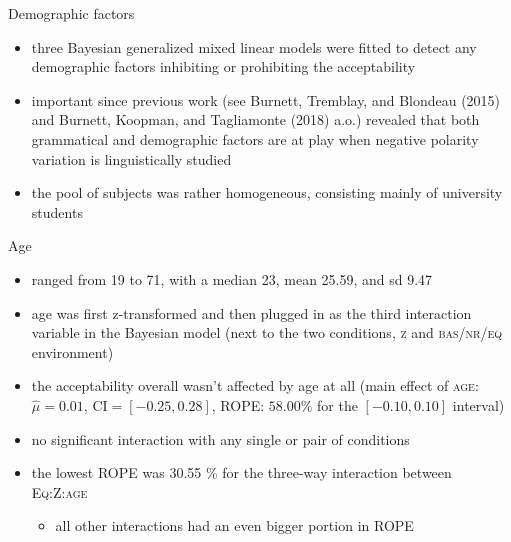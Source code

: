 \documentclass[
  ignorenonframetext,
]{beamer}
\providecommand{\tightlist}{%
  \setlength{\itemsep}{0pt}\setlength{\parskip}{0pt}}\usepackage{longtable,booktabs,array}
\begin{document}
\begin{frame}
\begin{block}{Demographic factors}
\protect\hypertarget{demographic-factors-1}{}
\begin{itemize}
\tightlist
\item
  three Bayesian generalized mixed linear models were fitted to detect
  any demographic factors inhibiting or prohibiting the acceptability
\item
  important since previous work (see Burnett, Tremblay, and Blondeau
  (2015) and Burnett, Koopman, and Tagliamonte (2018) a.o.) revealed
  that both grammatical and demographic factors are at play when
  negative polarity variation is linguistically studied
\item
  the pool of subjects was rather homogeneous, consisting mainly of
  university students
\end{itemize}
\end{block}
\end{frame}

\begin{frame}
\begin{block}{Age}
\protect\hypertarget{age}{}
\begin{itemize}
\tightlist
\item
  ranged from 19 to 71, with a median 23, mean 25.59, and sd 9.47
\item
  age was first z-transformed and then plugged in as the third
  interaction variable in the Bayesian model (next to the two
  conditions, \textsc{z} and \textsc{bas/nr/eq} environment)
\item
  the acceptability overall wasn't affected by age at all (main effect
  of \textsc{age}: \(\hat{\mu}=0.01\), \(\mathrm{CI}=[-0.25, 0.28]\),
  ROPE: \(58.00\%\) for the \([-0.10, 0.10]\) interval)
\item
  no significant interaction with any single or pair of conditions
\item
  the lowest ROPE was 30.55 \% for the three-way interaction between
  \textsc{Eq:Z:age}

  \begin{itemize}
  \tightlist
  \item
    all other interactions had an even bigger portion in ROPE
  \end{itemize}
\end{itemize}
\end{block}
\end{frame}
\end{document}
